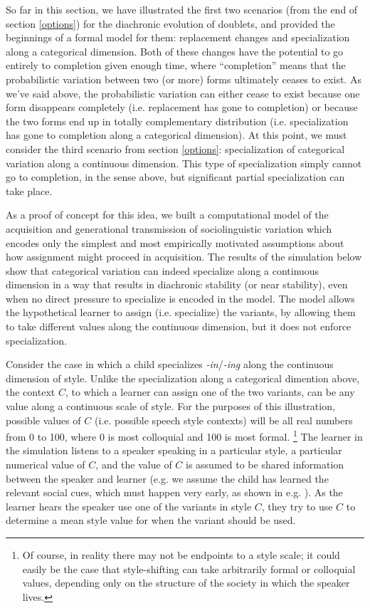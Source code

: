 So far in this section, we have illustrated the first two scenarios (from the end of section \ref{options}) for the diachronic evolution of doublets, and provided the beginnings of a formal model for them: replacement changes and specialization along a categorical dimension.
Both of these changes have the potential to go entirely to completion given enough time, where ``completion'' means that the probabilistic variation between two (or more) forms ultimately ceases to exist.
As we've said above, the probabilistic variation can either cease to exist because one form disappears completely (i.e. replacement has gone to completion) or because the two forms end up in totally complementary distribution (i.e. specialization has gone to completion along a categorical dimension).
At this point, we must consider the third scenario from section \ref{options}: specialization of categorical variation along a continuous dimension.
This type of specialization simply cannot go to completion, in the sense above, but significant partial specialization can take place.


As a proof of concept for this idea, we built a computational model of the acquisition and generational transmission of sociolinguistic variation which encodes only the simplest and most empirically motivated assumptions about how assignment might proceed in acquisition.
The results of the simulation below show that categorical variation can indeed specialize along a continuous dimension in a way that results in diachronic stability (or near stability), even when no direct pressure to specialize is encoded in the model.
The model allows the hypothetical learner to assign (i.e. specialize) the variants, by allowing them to take different values along the continuous dimension, but it does not enforce specialization.

Consider the case in which a child specializes \textsl{-in}/\textsl{-ing} along the continuous dimension of style.
Unlike the specialization along a categorical dimention above, the context $C$, to which a learner can assign one of the two variants, can be any value along a continuous scale of style.
For the purposes of this illustration, possible values of $C$ (i.e. possible speech style contexts) will be all real numbers from 0 to 100, where 0 is most colloquial and 100 is most formal.
\footnote{Of course, in reality there may not be endpoints to a style scale; it could easily be the case that style-shifting can take arbitrarily formal or colloquial values, depending only on the structure of the society in which the speaker lives.}
The learner in the simulation listens to a speaker speaking in a particular style, a particular numerical value of $C$, and the value of $C$ is assumed to be shared information between the speaker and learner (e.g. we assume the child has learned the relevant social cues, which must happen very early, as shown in e.g. \citealt{smithetal2007}).
As the learner hears the speaker use one of the variants in style $C$, they try to use $C$ to determine a mean style value for when the variant should be used.

